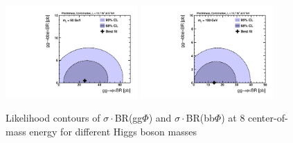 \vspace*{1cm}


\begin{figure}[!h]\begin{center}
 \includegraphics[width=0.45\textwidth]{MSSM/PLOTS/cmb-ggH-bbH-scan-GGH-BBH-90.pdf}
 \includegraphics[width=0.45\textwidth]{MSSM/PLOTS/cmb-ggH-bbH-scan-GGH-BBH-100.pdf}
 \caption{Likelihood contours of $\sigma\cdot$BR(gg$\Phi$) and $\sigma\cdot$BR(bb$\Phi$) at 8 \TeV center-of-mass energy for different Higgs boson masses}
  \label{fig:contour1}\end{center}\end{figure}






